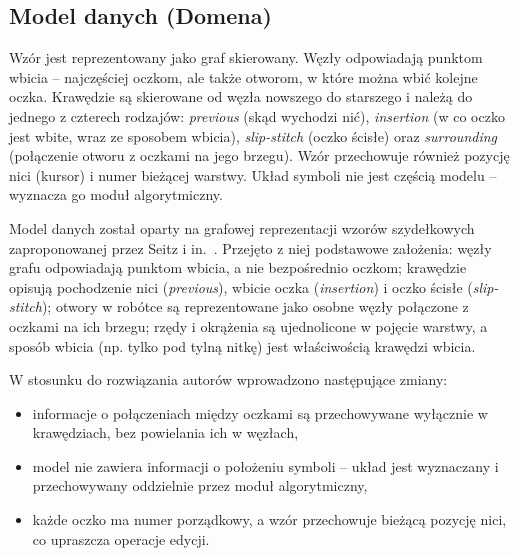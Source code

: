 \documentclass[a4paper,11pt]{article}
\begin{document}
\subsection{Model danych (Domena)}
\label{sec:data-model}

Wzór jest reprezentowany jako graf skierowany. Węzły odpowiadają punktom wbicia -- najczęściej oczkom, ale także otworom, w które można wbić kolejne oczka. Krawędzie są skierowane od węzła nowszego do starszego i należą do jednego z czterech rodzajów: \emph{previous} (skąd wychodzi nić), \emph{insertion} (w co oczko jest wbite, wraz ze sposobem wbicia), \emph{slip-stitch} (oczko ścisłe) oraz \emph{surrounding} (połączenie otworu z oczkami na jego brzegu). Wzór przechowuje również pozycję nici (kursor) i numer bieżącej warstwy. Układ symboli nie jest częścią modelu -- wyznacza go moduł algorytmiczny.

Model danych został oparty na grafowej reprezentacji wzorów szydełkowych zaproponowanej przez Seitz i in.~\cite{seitz2022digital, seitz2021language}. Przejęto z niej podstawowe założenia: węzły grafu odpowiadają punktom wbicia, a nie bezpośrednio oczkom; krawędzie opisują pochodzenie nici (\emph{previous}), wbicie oczka (\emph{insertion}) i oczko ścisłe (\emph{slip-stitch}); otwory w robótce są reprezentowane jako osobne węzły połączone z oczkami na ich brzegu; rzędy i okrążenia są ujednolicone w pojęcie warstwy, a sposób wbicia (np. tylko pod tylną nitkę) jest właściwością krawędzi wbicia.

W stosunku do rozwiązania autorów wprowadzono następujące zmiany:
\begin{itemize}
  \item informacje o połączeniach między oczkami są przechowywane wyłącznie w krawędziach, bez powielania ich w węzłach,
  \item model nie zawiera informacji o położeniu symboli -- układ jest wyznaczany i przechowywany oddzielnie przez moduł algorytmiczny,
  \item każde oczko ma numer porządkowy, a wzór przechowuje bieżącą pozycję nici, co upraszcza operacje edycji.
\end{itemize}
\end{document}
